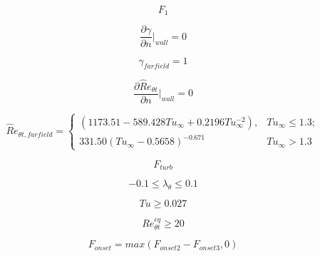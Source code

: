 \documentclass[8pt]{article}
\begin{document}
\begin{equation}
   F_1
\end{equation}

\begin{equation}
   \frac{\partial \gamma}{\partial n} \vert _{wall} = 0
\end{equation}

\begin{equation}
   \gamma_{farfield} = 1
\end{equation}

\begin{equation}
   \frac{\partial \hat Re_{\theta t}}{\partial n} \vert _{wall} = 0
\end{equation}

\begin{equation}
   \hat Re_{\theta t, farfield} = \left\{ 
      \begin{array}{ll}
         \left( 1173.51 - 589.428 Tu _{\infty} + 0.2196 Tu_{\infty}^{-2} \right), & Tu_{\infty} \leq 1.3; \\
         331.50 \left(Tu_{\infty} - 0.5658 \right) ^{-0.671} & Tu_{\infty} > 1.3
      \end{array} \right.
\end{equation}

\begin{equation}
   F_{turb}
\end{equation}

\begin{equation}
   -0.1 \leq \lambda_{\theta} \leq 0.1
\end{equation}

\begin{equation}
   Tu \geq 0.027
\end{equation}

\begin{equation}
   Re_{\theta t} ^{eq} \geq 20
\end{equation}

\begin{equation}
   F_{onset} = max \left(F_{onset2} - F_{onset3}, 0 \right)
\end{equation}
\end{document}
